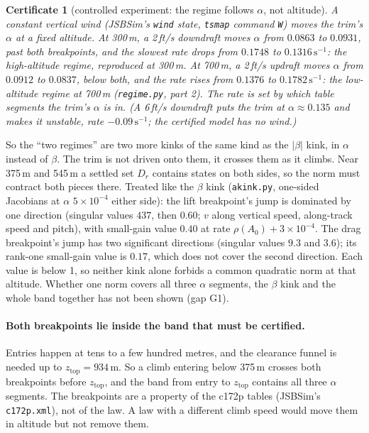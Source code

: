 \documentclass[11pt]{article}
\newtheorem{cert}{Certificate}
\newcommand{\zTop}{z_{\mathrm{top}}}
\begin{document}
\begin{cert}[controlled experiment: the regime follows $\alpha$, not altitude]\label{cert:wind}
A constant vertical wind (JSBSim's \texttt{wind} state, \texttt{tsmap} command \texttt{W}) moves the trim's $\alpha$ at a fixed altitude. At 300\,m, a 2\,ft/s downdraft moves $\alpha$ from $0.0863$ to $0.0931$, past both breakpoints, and the slowest rate drops from $0.1748$ to $0.1316\,\mathrm{s}^{-1}$: the high-altitude regime, reproduced at 300\,m. At 700\,m, a 2\,ft/s updraft moves $\alpha$ from $0.0912$ to $0.0837$, below both, and the rate rises from $0.1376$ to $0.1782\,\mathrm{s}^{-1}$: the low-altitude regime at 700\,m (\texttt{regime.py}, part 2). The rate is set by which table segments the trim's $\alpha$ is in. (A 6\,ft/s downdraft puts the trim at $\alpha \approx 0.135$ and makes it unstable, rate $-0.09\,\mathrm{s}^{-1}$; the certified model has no wind.)
\end{cert}

So the ``two regimes'' are two more kinks of the same kind as the $|\beta|$ kink, in $\alpha$ instead of $\beta$. The trim is not driven onto them, it crosses them as it climbs. Near 375\,m and 545\,m a settled set $D_r$ contains states on both sides, so the norm must contract both pieces there. Treated like the $\beta$ kink (\texttt{akink.py}, one-sided Jacobians at $\alpha$ $5\times10^{-4}$ either side): the lift breakpoint's jump is dominated by one direction (singular values $437$, then $0.60$; $v$ along vertical speed, along-track speed and pitch), with small-gain value $0.40$ at rate $\rho(A_0) + 3\times10^{-4}$. The drag breakpoint's jump has two significant directions (singular values $9.3$ and $3.6$); its rank-one small-gain value is $0.17$, which does not cover the second direction. Each value is below 1, so neither kink alone forbids a common quadratic norm at that altitude. Whether one norm covers all three $\alpha$ segments, the $\beta$ kink and the whole band together has not been shown (gap G1).

\paragraph{Both breakpoints lie inside the band that must be certified.} Entries happen at tens to a few hundred metres, and the clearance funnel is needed up to $\zTop = 934$\,m. So a climb entering below 375\,m crosses both breakpoints before $\zTop$, and the band from entry to $\zTop$ contains all three $\alpha$ segments. The breakpoints are a property of the c172p tables (JSBSim's \texttt{c172p.xml}), not of the law. A law with a different climb speed would move them in altitude but not remove them.
\end{document}
